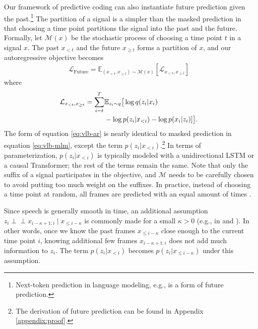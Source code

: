 \documentclass[11pt,a4paper]{article}
\newcommand{\ind}{\perp\!\!\!\!\perp}
\begin{document}
Our framework of predictive coding can also instantiate future prediction given the past.\footnote{Next-token prediction in language modeling, e.g., is a form of future prediction.}
The partition of a signal is a simpler than the masked prediction in that choosing a time point partitions the signal into the past and the future.
Formally, let $\mathcal{M}(x)$ be the stochastic process of choosing a time point $t$ in a signal $x$.
The past $x_{< t}$ and the future $x_{\geq t}$ forms a partition of $x$, and our autoregressive objective becomes
\begin{align}
\mathcal{L}_{\text{Future}} = \mathbb{E}_{(x_{< t}, x_{\geq t}) \sim \mathcal{M}(x)} [\mathcal{L}_{x_{< t}, x_{\geq t}}]
\end{align}
where
\begin{align}
\mathcal{L}_{x_{< t}, x_{\geq t}}
  = \sum_{i = t}^{T} & \mathbb{E}_{z_i \sim q} \big[ \log q(z_i|x_i) \label{eq:vlb-ar} \\
  & - \log p(z_i|x_{< i}) - \log p(x_i | z_i)]\big]. \notag
\end{align}
The form of equation \ref{eq:vlb-ar} is nearly identical to masked prediction in equation \ref{eq:vlb-mlm}, except the term $p(z_i | x_{< i})$.\footnote{The derivation of future prediction can be found in Appendix \ref{appendix:proof}.}
In terms of parameterization, $p(z_i | x_{< i})$ is typically modeled with a unidirectional LSTM or a causal Transformer; the rest of the terms remain the same.
Note that only the suffix of a signal participates in the objective, and $\mathcal{M}$ needs to be carefully chosen to avoid putting too much weight on the suffixes.
In practice, instead of choosing a time point at random, all frames are predicted with an equal amount of times \citep{oord2018representation,chung2019unsupervised}.

Since speech is generally smooth in time, an additional assumption $z_i \ind x_{i-\kappa+1:i} \mid x_{\leq i-\kappa}$ is commonly made for a small $\kappa > 0$ (e.g., in \citet{oord2018representation} and \citet{chung2019unsupervised}).
In other words, once we know the past frames $x_{\leq i-\kappa}$
close enough to the current time point $i$,
knowing additional few frames $x_{i-\kappa+1:i}$
does not add much information to $z_i$. 
The term $p(z_i | x_{< i})$ becomes $p(z_i | x_{\leq i-\kappa})$ under this assumption.

%
%
%
%
%
%
%
%
%
%
%
%
%
%
%
%
%
%
%
%
%
%
%
%
%
%
%
%
%
%
%
%
%
%
%
%
%
%
%
%
%
%
%
%
%
%
%
%
%
%
%


\end{document}
